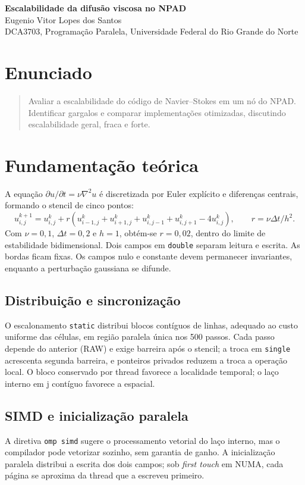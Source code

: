 \documentclass[11pt,letterpaper]{article}
\begin{document}
\pagestyle{plain}
\begin{center}
{\LARGE\bfseries Escalabilidade da difusão viscosa no NPAD}\\[0.4em]
{\normalsize Eugenio Vitor Lopes dos Santos}\\[0.3em]
{\small DCA3703, Programação Paralela, Universidade Federal do Rio Grande do Norte}
\end{center}

\section{Enunciado}
\begin{quote}
Avaliar a escalabilidade do código de Navier--Stokes em um nó do NPAD. Identificar gargalos e comparar implementações otimizadas, discutindo escalabilidade geral, fraca e forte.
\end{quote}

\section{Fundamentação teórica}
A equação $\partial u/\partial t=\nu\nabla^2u$ é discretizada por Euler explícito e diferenças centrais, formando o stencil de cinco pontos:
\[
u^{k+1}_{i,j}=u^k_{i,j}+r(u^k_{i-1,j}+u^k_{i+1,j}+u^k_{i,j-1}+u^k_{i,j+1}-4u^k_{i,j}),
\qquad r=\nu\Delta t/h^2.
\]
Com $\nu=0{,}1$, $\Delta t=0{,}2$ e $h=1$, obtém-se $r=0{,}02$, dentro do limite de estabilidade bidimensional. Dois campos em \texttt{double} separam leitura e escrita. As bordas ficam fixas. Os campos nulo e constante devem permanecer invariantes, enquanto a perturbação gaussiana se difunde.

\subsection{Distribuição e sincronização}
O escalonamento \texttt{static} distribui blocos contíguos de linhas, adequado ao custo uniforme das células, em região paralela única nos 500 passos. Cada passo depende do anterior (RAW) e exige barreira após o stencil; a troca em \texttt{single} acrescenta segunda barreira, e ponteiros privados reduzem a troca a operação local. O bloco conservado por thread favorece a localidade temporal; o laço interno em j contíguo favorece a espacial.

\subsection{SIMD e inicialização paralela}
A diretiva \texttt{omp simd} sugere o processamento vetorial do laço interno, mas o compilador pode vetorizar sozinho, sem garantia de ganho. A inicialização paralela distribui a escrita dos dois campos; sob \textit{first touch} em NUMA, cada página se aproxima da thread que a escreveu primeiro.
\end{document}
